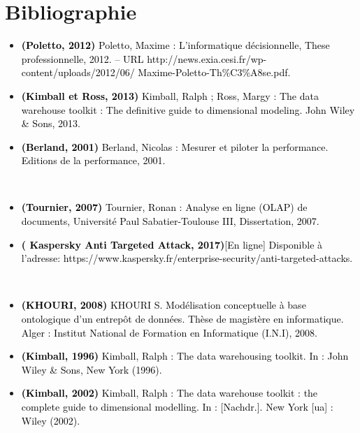 \chapter*{Bibliographie}
\begin{itemize}

	\item[] \textcolor{black}{
\textbf{(Poletto, 2012)} Poletto, Maxime : L’informatique décisionnelle, These professionnelle, 2012. – URL http://news.exia.cesi.fr/wp-content/uploads/2012/06/
Maxime-Poletto-Th\%C3\%A8se.pdf.	
}
~~\\

	\item[] \textcolor{black}{
\textbf{(Kimball et Ross, 2013)} Kimball, Ralph ; Ross, Margy : The data warehouse toolkit : The definitive guide to dimensional modeling. John Wiley \& Sons, 2013.	
}
~~\\

	\item[] \textcolor{black}{
\textbf{(Berland, 2001)} Berland, Nicolas : Mesurer et piloter la performance. Editions de la 	performance, 2001.}

~~\\

	\item[] \textcolor{black}{
\textbf{(Tournier, 2007)} Tournier, Ronan : Analyse en ligne (OLAP) de documents, Université Paul Sabatier-Toulouse III, Dissertation, 2007.	
}
~~\\


\item[] \textcolor{black}{
\textbf{( Kaspersky Anti Targeted Attack, 2017)}[En ligne] Disponible à l'adresse: https://www.kaspersky.fr/enterprise-security/anti-targeted-attacks.
}

~~\\
	\item[] \textcolor{black}{
\textbf{(KHOURI, 2008)} KHOURI S. Modélisation conceptuelle à base ontologique d’un entrepôt de données. Thèse de magistère en informatique. Alger : Institut National de Formation en Informatique (I.N.I), 2008.	
}
~~\\
	\item[] \textcolor{black}{
\textbf{ (Kimball, 1996)} Kimball, Ralph : The data warehousing toolkit.
 In : John Wiley \& Sons, New York (1996).	
}
~~\\

	\item[] \textcolor{black}{
\textbf{(Kimball, 2002)} Kimball, Ralph : The data warehouse toolkit :
the complete guide to dimensional modelling. In : [Nachdr.]. New York [ua] : Wiley (2002).	
}


\end{itemize}
